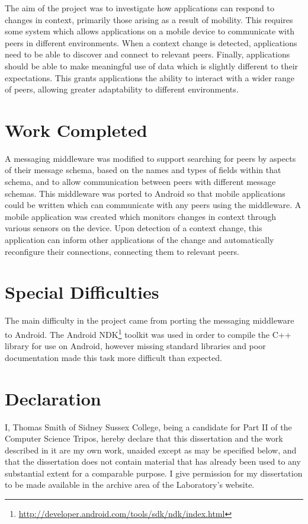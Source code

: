 \documentclass[12pt,twoside,notitlepage]{report}
\begin{document}
The aim of the project was to investigate how applications can respond to changes in context, primarily those arising as a result of mobility. 
This requires some system which allows applications on a mobile device to communicate with peers in different environments. 
When a context change is detected, applications need to be able to discover and connect to relevant peers. 
Finally, applications should be able to make meaningful use of data which is slightly different to their expectations. 
This grants applications the ability to interact with a wider range of peers, allowing greater adaptability to different environments.

\section*{Work Completed}

A messaging middleware was modified to support searching for peers by aspects of their message schema, based on the names and types of fields within that schema, and to allow communication between peers with different message schemas. 
This middleware was ported to Android so that mobile applications could be written which can communicate with any peers using the middleware. 
A mobile application was created which monitors changes in context through various sensors on the device. 
Upon detection of a context change, this application can inform other applications of the change and automatically reconfigure their connections, connecting them to relevant peers. 

\section*{Special Difficulties}

The main difficulty in the project came from porting the messaging middleware to Android. The Android NDK\footnote{\url{http://developer.android.com/tools/sdk/ndk/index.html}} toolkit was used in order to compile the C++ library for use on Android, however missing standard libraries and poor documentation made this task more difficult than expected.
 
\section*{Declaration}

I, Thomas Smith of Sidney Sussex College, being a candidate for Part II of the Computer
Science Tripos, hereby declare that this dissertation and the work described in it are my own work,
unaided except as may be specified below, and that the dissertation
does not contain material that has already been used to any substantial
extent for a comparable purpose. 
I give permission for my dissertation to be made available in the archive area of the Laboratory's website.
\end{document}
